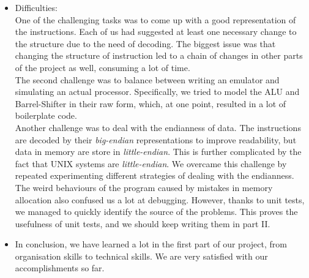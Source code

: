\documentclass[12pt]{article}
\begin{document}
\begin{itemize}
  \item Difficulties:\\
  One of the challenging tasks was to come up with a good representation of the instructions. Each of us had suggested at least one necessary change to the structure due to the need of decoding. The biggest issue was that changing the structure of instruction led to a chain of changes in other parts of the project as well, consuming a lot of time.\\
  The second challenge was to balance between writing an emulator and simulating an actual processor. Specifically, we tried to model the ALU and Barrel-Shifter in their raw form, which, at one point, resulted in a lot of boilerplate code.\\
  Another challenge was to deal with the endianness of data. The instructions are decoded by their \textit{big-endian} representations to improve readability, but data in memory are store in \textit{little-endian}. This is further complicated by the fact that UNIX systems are \textit{little-endian}. We overcame this challenge by repeated experimenting different strategies of dealing with the endianness.\\
  The weird behaviours of the program caused by mistakes in memory allocation also confused us a lot at debugging. However, thanks to unit tests, we managed to quickly identify the source of the problems. This proves the usefulness of unit tests, and we should keep writing them in part II.
  
  \item In conclusion, we have learned a lot in the first part of our project, from organisation skills to technical skills. We are very satisfied with our accomplishments so far.
\end{itemize}
 
 
\end{document}
